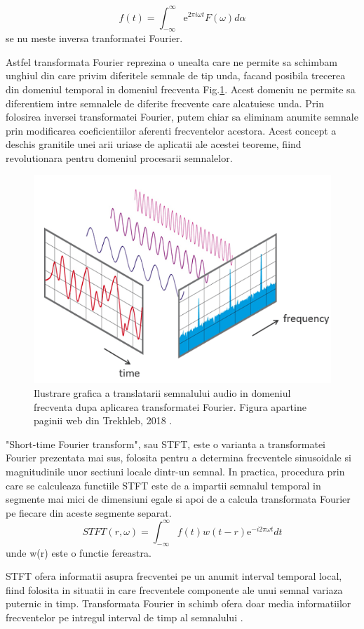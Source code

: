 \documentclass[a4paper,12pt]{book}
\begin{document}
			\begin{equation*}
				f(t) = \int_{-\infty}^{\infty}  \mathrm{e}^{2\pi i\omega t} F(\omega) d\alpha
			\end{equation*}
				se nu meste inversa tranformatei Fourier. \par
			Astfel transformata Fourier reprezina o unealta care ne permite sa schimbam unghiul din care privim diferitele semnale de tip unda, facand posibila trecerea din domeniul temporal in domeniul frecventa Fig.\ref{fig:tf}. Acest domeniu ne permite sa diferentiem intre semnalele de diferite frecvente care alcatuiesc unda. Prin folosirea inversei transformatei Fourier, putem chiar sa eliminam anumite semnale prin modificarea coeficientiilor aferenti frecventelor acestora. Acest concept a deschis granitile unei arii uriase de aplicatii ale acestei teoreme, fiind revolutionara pentru domeniul procesarii semnalelor.  	
				\begin{figure}[h]
					\centering
					\includegraphics[scale=0.50]{ft}
					\caption{Ilustrare grafica a translatarii semnalului audio in domeniul frecventa dupa aplicarea transformatei Fourier. Figura apartine paginii web din Trekhleb, 2018 \cite{stft6}.}
					\label{fig:tf}
				\end{figure}		
				
			"Short-time Fourier transform", sau STFT, este o varianta a transformatei Fourier prezentata mai sus, folosita pentru a determina frecventele sinusoidale si magnitudinile unor sectiuni locale dintr-un semnal. In practica, procedura prin care se calculeaza functiile STFT este de a impartii semnalul temporal in segmente mai mici de dimensiuni egale si apoi de a calcula transformata Fourier pe fiecare din aceste segmente separat. 
			\begin{equation*}
			STFT(r , \omega) = \int_{-\infty}^{\infty}  f(t) w(t-r)\mathrm{e}^{- i 2\pi \omega t}  dt
			\end{equation*}
			unde w(r) este o functie fereastra. \par
			STFT ofera informatii asupra frecventei pe un anumit interval temporal local, fiind folosita in situatii in care frecventele componente ale unui semnal variaza puternic in timp. Transformata Fourier in schimb ofera doar media informatiilor frecventelor pe intregul interval de timp al semnalului \cite{stft2}.
			
\end{document}
